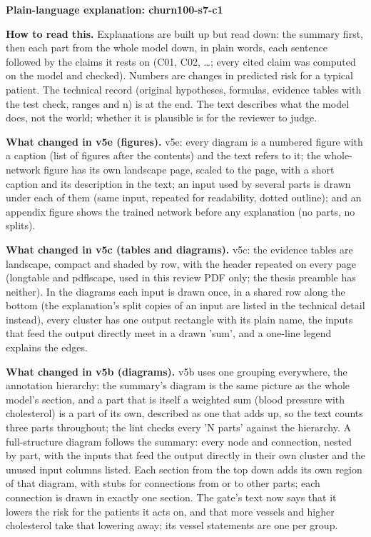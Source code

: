 \documentclass[a4paper,10pt]{article}
\begin{document}
\begin{center}{\Large\bfseries Plain-language explanation: churn100-s7-c1\par}\vspace{2mm}{\small AI-assisted drafts for review. Nothing here has been verified by a person.\par}\end{center}
\noindent\textbf{How to read this.} Explanations are built up but read down: the summary first, then each part from the whole model down, in plain words, each sentence followed by the claims it rests on (C01, C02, \ldots; every cited claim was computed on the model and checked). Numbers are changes in predicted risk for a typical patient. The technical record (original hypotheses, formulas, evidence tables with the test check, ranges and n) is at the end. The text describes what the model does, not the world; whether it is plausible is for the reviewer to judge.
\par\medskip\noindent\textbf{What changed in v5e (figures).} v5e: every diagram is a numbered figure with a caption (list of figures after the contents) and the text refers to it; the whole-network figure has its own landscape page, scaled to the page, with a short caption and its description in the text; an input used by several parts is drawn under each of them (same input, repeated for readability, dotted outline); and an appendix figure shows the trained network before any explanation (no parts, no splits).
\par\medskip\noindent\textbf{What changed in v5c (tables and diagrams).} v5c: the evidence tables are landscape, compact and shaded by row, with the header repeated on every page (longtable and pdflscape, used in this review PDF only; the thesis preamble has neither). In the diagrams each input is drawn once, in a shared row along the bottom (the explanation's split copies of an input are listed in the technical detail instead), every cluster has one output rectangle with its plain name, the inputs that feed the output directly meet in a drawn 'sum', and a one-line legend explains the edges.
\par\medskip\noindent\textbf{What changed in v5b (diagrams).} v5b uses one grouping everywhere, the annotation hierarchy: the summary's diagram is the same picture as the whole model's section, and a part that is itself a weighted sum (blood pressure with cholesterol) is a part of its own, described as one that adds up, so the text counts three parts throughout; the lint checks every 'N parts' against the hierarchy. A full-structure diagram follows the summary: every node and connection, nested by part, with the inputs that feed the output directly in their own cluster and the unused input columns listed. Each section from the top down adds its own region of that diagram, with stubs for connections from or to other parts; each connection is drawn in exactly one section. The gate's text now says that it lowers the risk for the patients it acts on, and that more vessels and higher cholesterol take that lowering away; its vessel statements are one per group.
\end{document}
